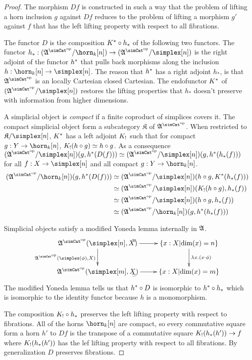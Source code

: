 \documentclass[csh.tex]{subfiles}
\begin{document}
\newcommand\compact{\mathfrak{K}}
\newcommand\slice[1]{(\ambient\s/#1)}
\begin{proof}
The morphism $Df$ is constructed in such a way that the problem of lifting a horn inclusion $g$ against $Df$ reduces to the problem of lifting a morphism $g'$ against $f$ that has the left lifting property with respect to all fibrations. %


The functor $D$ is the composition $K^*\circ h_*$ of the following two functors. The functor $h_*\of\slice{\horn_k[n]}\to\slice{\simplex[n]}$ is the right adjoint of the functor $h^*$ that pulls back morphisms along the inclusion $h\of\horn_k[n]\to\simplex[n]$. The reason that $h^*$ has a right adjoint $h_*$, is that $\ambient\s$ is an locally Cartesian closed Cartesian. The endofunctor $K^*$ of $\slice{\simplex[n]}$ restores the lifting properties that $h_*$ doesn't preserve with information from higher dimensions. %

A simplicial object is \emph{compact} if a finite coproduct of simplices covers it. 
The compact simplicial object form a subcategory $\compact$ of $\ambient\s$. When restricted to $\compact/\simplex[n]$, $K^*$ has a left adjoint $K_!$ such that for compact $g\of Y\to \horn_k[n]$, $K_!(h\circ g)\simeq h\circ g$.%
As a consequence $\slice{\simplex[n]}(g,h\ri(D(f)))\simeq \slice{\simplex[n]}(g,h\ri(h_*(f)))$ for all $f\of X\to\simplex[n]$ and all compact $g\of Y\to \horn_k[n]$.
\begin{align*}
\slice{\horn_k[n]}(g,h\ri(D(f)))&\simeq\slice{\simplex[n]}(h\circ g,K\ri(h_*(f)))\\
&\simeq \slice{\simplex[n]}(K_\bang(h\circ g),h_*(f)) \\
&\simeq \slice{\simplex[n]}(h\circ g,h_*(f)) \\
&\simeq \slice{\horn_k[n]}(g,h\ri(h_*(f)))
\end{align*}

Simplicial objects satisfy a modified Yoneda lemma internally in $\mathfrak A$.
\[\xymatrix{
\ambient\s(\simplex[n],X) \ar[r]^(.4)\simeq \ar[d]_{\ambient\s(\simplex(\phi),X)} & \set{x\of X\middle|\dim(x)=n}\ar[d]^{\lambda x. (x\cdot\phi)}\\
\ambient\s(\simplex[m],X)\ar[r]_(.4)\simeq & \set{x\of X\middle|\dim(x)=m}
}\]
The modified Yoneda lemma tells us that $h^*\circ D$ is isomorphic to $h^*\circ h_*$ which is isomorphic to the identity functor because $h$ is a monomorphism.

The composition $K_!\circ h_*$ preserves the left lifting property with respect to fibrations. %
All of the horns $\horn_k[n]$ are compact, so every commutative square form a horn $h'$ to $Df$ is the transpose of a commutative square $K_!(h_*(h'))\to f$ where $K_!(h_*(h'))$ has the lef lifting property with respect to all fibrations. By generalization $D$ preserves fibrations. 
\end{proof}
\end{document}
